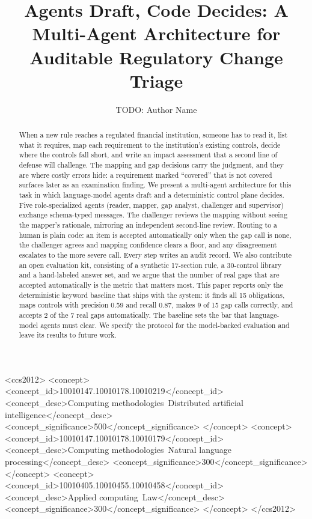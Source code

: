 \documentclass[sigconf,review,anonymous]{acmart}
\newcommand{\gapnone}{\textsf{none}}
\begin{document}
\title{Agents Draft, Code Decides: A Multi-Agent Architecture for Auditable Regulatory Change Triage}

\author{TODO: Author Name}

\renewcommand{\shortauthors}{Anonymous}

\begin{abstract}
When a new rule reaches a regulated financial institution, someone has to
read it, list what it requires, map each requirement to the institution's
existing controls, decide where the controls fall short, and write an impact
assessment that a second line of defense will challenge. The mapping and gap
decisions carry the judgment, and they are where costly errors hide: a
requirement marked ``covered'' that is not covered surfaces later as an
examination finding. We present a multi-agent architecture for this task in
which language-model agents draft and a deterministic control plane decides.
Five role-specialized agents (reader, mapper, gap analyst, challenger and
supervisor) exchange schema-typed messages. The challenger reviews the
mapping without seeing the mapper's rationale, mirroring an independent
second-line review. Routing to a human is plain code: an item is accepted
automatically only when the gap call is \gapnone{}, the challenger agrees and
mapping confidence clears a floor, and any disagreement escalates to the more
severe call. Every step writes an audit record. We also contribute an open
evaluation kit, consisting of a synthetic 17-section rule, a 30-control
library and a hand-labeled answer set, and we argue that the number of real
gaps that are accepted automatically is the metric that matters most. This
paper reports only the deterministic keyword baseline that ships with the
system: it finds all 15 obligations, maps controls with precision 0.59 and
recall 0.87, makes 9 of 15 gap calls correctly, and accepts 2 of the 7 real
gaps automatically. The baseline sets the bar that language-model agents must
clear. We specify the protocol for the model-backed evaluation and leave its
results to future work.
\end{abstract}

\begin{CCSXML}
<ccs2012>
   <concept>
       <concept_id>10010147.10010178.10010219</concept_id>
       <concept_desc>Computing methodologies~Distributed artificial intelligence</concept_desc>
       <concept_significance>500</concept_significance>
   </concept>
   <concept>
       <concept_id>10010147.10010178.10010179</concept_id>
       <concept_desc>Computing methodologies~Natural language processing</concept_desc>
       <concept_significance>300</concept_significance>
   </concept>
   <concept>
       <concept_id>10010405.10010455.10010458</concept_id>
       <concept_desc>Applied computing~Law</concept_desc>
       <concept_significance>300</concept_significance>
   </concept>
</ccs2012>
\end{CCSXML}
\end{document}
